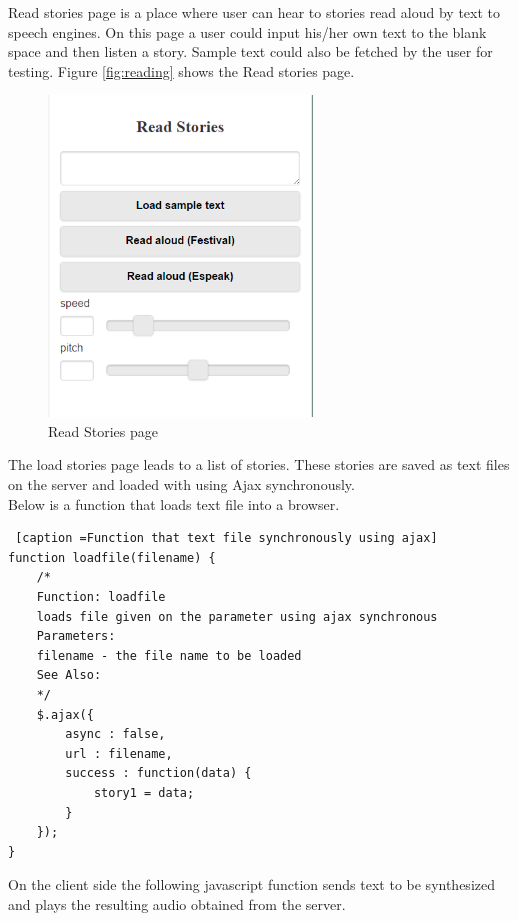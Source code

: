 \documentclass[11pt,a4paper,oneside,article]{memoir}
\begin{document}
Read stories page is a place where user can hear to stories read aloud by text to speech engines. On this page a user could input his/her own text to the blank space and then listen a story. Sample text could also be fetched by the user for testing. Figure  \vref{fig:reading} shows the Read stories page.

\begin{figure}[!ht]
\includegraphics[width=7cm]{reading}
\caption{ Read Stories page}
\label{fig:reading}
\end{figure}

The load stories page leads to a list of stories. These stories are saved as text files on the server and loaded with using Ajax synchronously. \\ Below is a function that loads text file into a browser.


\begin{minipage}{\linewidth}
\begin{lstlisting} [caption =Function that text file synchronously using ajax]
function loadfile(filename) {
    /*
    Function: loadfile
    loads file given on the parameter using ajax synchronous
    Parameters:
    filename - the file name to be loaded                            
    See Also:       
    */
    $.ajax({
        async : false,
        url : filename,
        success : function(data) {
            story1 = data;
        }
    });
}

\end{lstlisting}
\end{minipage}

On the client side the following javascript function sends text to be synthesized and plays the resulting audio obtained from the server.
\end{document}
